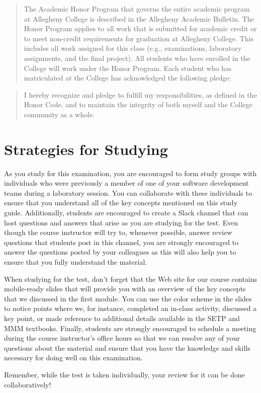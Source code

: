 \documentclass[11pt]{article}
\begin{document}
\begin{quote}

  The Academic Honor Program that governs the entire academic program at
  Allegheny College is described in the Allegheny Academic Bulletin. The Honor
  Program applies to all work that is submitted for academic credit or to meet
  non-credit requirements for graduation at Allegheny College. This includes all
  work assigned for this class (e.g., examinations, laboratory assignments, and
  the final project). All students who have enrolled in the College will work
  under the Honor Program. Each student who has matriculated at the College has
  acknowledged the following pledge:

\end{quote}

\begin{quote}

  I hereby recognize and pledge to fulfill my responsibilities, as defined in
  the Honor Code, and to maintain the integrity of both myself and the College
  community as a whole.

\end{quote}

\section*{Strategies for Studying}

As you study for this examination, you are encouraged to form study groups with
individuals who were previously a member of one of your software development
teams during a laboratory session. You can collaborate with these individuals to
ensure that you understand all of the key concepts mentioned on this study
guide. Additionally, students are encouraged to create a Slack channel that can
host questions and answers that arise as you are studying for the test. Even
though the course instructor will try to, whenever possible, answer review
questions that students post in this channel, you are strongly encouraged to
answer the questions posted by your colleagues as this will also help you to
ensure that you fully understand the material.

When studying for the test, don't forget that the Web site for our course
contains mobile-ready slides that will provide you with an overview of the key
concepts that we discussed in the first module. You can use the color scheme in
the slides to notice points where we, for instance, completed an in-class
activity, discussed a key point, or made reference to additional details
available in the SETP and MMM textbooks. Finally, students are strongly
encouraged to schedule a meeting during the course instructor's office hours so
that we can resolve any of your questions about the material and ensure that you
have the knowledge and skills necessary for doing well on this examination.

Remember, while the test is taken individually, your review for it can be done
collaboratively!
\end{document}
